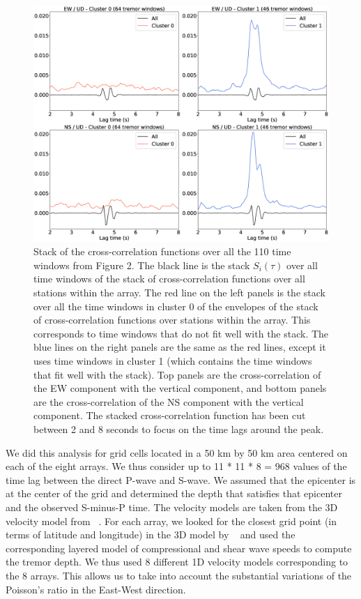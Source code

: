 \documentclass[draft]{agujournal2019}
\begin{document}
\begin{figure}
\noindent\includegraphics[width=\textwidth, trim={0cm 0cm 0cm 0cm},clip]{figures/BS_-05_-05_PWS_PWS_cluster_stackcc.eps}
\caption{Stack of the cross-correlation functions over all the 110 time windows from Figure 2. The black line is the stack $S_i (\tau)$ over all time windows of the stack of cross-correlation functions over all stations within the array. The red line on the left panels is the stack over all the time windows in cluster 0 of the envelopes of the stack of cross-correlation functions over stations within the array.  This corresponds to time windows that do not fit well with the stack. The blue lines on the right panels are the same as the red lines, except it uses time windows in cluster 1 (which contains the time windows that fit well with the stack). Top panels are the cross-correlation of the EW component with the vertical component, and bottom panels are the cross-correlation of the NS component with the vertical component. The stacked cross-correlation function has been cut between 2 and 8 seconds to focus on the time lags around the peak.}
\label{pngfiguresample}
\end{figure}

We did this analysis for grid cells located in a 50 km by 50 km area centered on each of the eight arrays. We thus consider up to 11 * 11 * 8 = 968 values of the time lag between the direct P-wave and S-wave. We assumed that the epicenter is at the center of the grid and determined the depth that satisfies that epicenter and the observed S-minus-P time. The velocity models are taken from the 3D velocity model from ~. For each array, we looked for the closest grid point (in terms of latitude and longitude) in the 3D model by ~ and used the corresponding layered model of compressional and shear wave speeds to compute the tremor depth. We thus used 8 different 1D velocity models corresponding to the 8 arrays. This allows us to take into account the substantial variations of the Poisson's ratio in the East-West direction. \\
\end{document}
